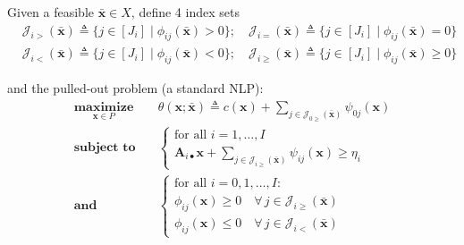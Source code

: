 \documentclass[aspectratio=169,xcolor=dvipsnames]{beamer}
\begin{document}
\begin{frame}
  \footnotesize
  \setlength{\abovedisplayskip}{4pt}
  \setlength{\belowdisplayskip}{4pt}
  \setlength{\abovedisplayshortskip}{3pt}
  \setlength{\belowdisplayshortskip}{3pt}

  Given a feasible $\bar{\mathbf{x}}\in X$, define 4 index sets
  \[
    \begin{aligned}
      &\mathcal{J}_{i>}(\bar{\mathbf{x}})\triangleq
        \{j\in[J_i]\mid\phi_{ij}(\bar{\mathbf{x}})>0\};\quad
       \mathcal{J}_{i=}(\bar{\mathbf{x}})\triangleq
        \{j\in[J_i]\mid\phi_{ij}(\bar{\mathbf{x}})=0\}\\
      &\mathcal{J}_{i<}(\bar{\mathbf{x}})\triangleq
        \{j\in[J_i]\mid\phi_{ij}(\bar{\mathbf{x}})<0\};\quad
       \mathcal{J}_{i\geq}(\bar{\mathbf{x}})\triangleq
        \{j\in[J_i]\mid\phi_{ij}(\bar{\mathbf{x}})\geq0\}
    \end{aligned}
  \]

  and the {\color{MediumBlue}pulled-out} problem (a standard NLP):
  \[
    \begin{aligned}
      \operatorname*{\textbf{maximize}}_{\mathbf{x}\in P}\quad
      &\theta(\mathbf{x};\bar{\mathbf{x}})\triangleq c(\mathbf{x})
        +\sum_{j\in\mathcal{J}_{0\geq}(\bar{\mathbf{x}})}\psi_{0j}(\mathbf{x})\\
      \operatorname*{\textbf{subject to}}\quad
      &\left\{
        \begin{array}{l}
          \text{for all }i=1,\ldots,I\\[4pt]
          \mathbf{A}_{i\bullet}\mathbf{x}
            +\displaystyle\sum_{j\in\mathcal{J}_{i\geq}(\bar{\mathbf{x}})}
            \psi_{ij}(\mathbf{x})\geq\eta_i
        \end{array}\right.\\[2pt]
      \textbf{and}\quad
      &\left\{
        \begin{array}{l}
          \text{for all }i=0,1,\ldots,I:\\[4pt]
          \phi_{ij}(\mathbf{x})\geq 0\quad
            \forall\,j\in\mathcal{J}_{i\geq}(\bar{\mathbf{x}})\\[3pt]
          \phi_{ij}(\mathbf{x})\leq 0\quad
            \forall\,j\in\mathcal{J}_{i<}(\bar{\mathbf{x}})
        \end{array}\right.
    \end{aligned}
  \]
\end{frame}
\end{document}

